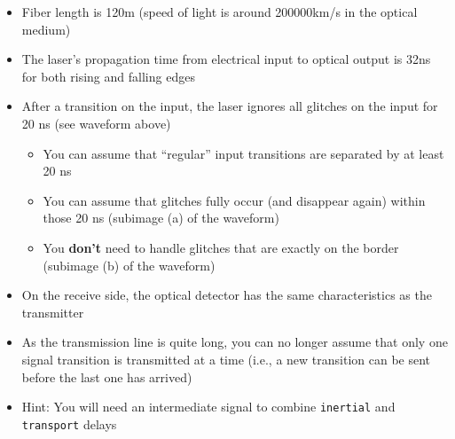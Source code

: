 \documentclass[12pt,epsf,makeidx,oneside]{book}
\begin{document}
\begin{itemize}[noitemsep]
  \item Fiber length is 120m (speed of light is around 200000km/s in the optical medium)
  \item The laser's propagation time from electrical input to optical output is 32ns for both rising and falling edges
  \item After a transition on the input, the laser ignores all glitches on the input for 20 ns (see waveform above)
  \begin{itemize}[noitemsep]
    \item You can assume that ``regular'' input transitions are separated by at least 20 ns
    \item You can assume that glitches fully occur (and disappear again) within those 20 ns (subimage (a) of the waveform)
    \item You {\bf don't} need to handle glitches that are exactly on the border (subimage (b) of the waveform)
  \end{itemize}
  \item On the receive side, the optical detector has the same characteristics as the transmitter
  \item As the transmission line is quite long, you can no longer assume that only one signal transition is transmitted at a time (i.e., a new transition can be sent before the last one has arrived)
  \item Hint: You will need an intermediate signal to combine {\tt inertial} and {\tt transport} delays
\end{itemize}
\end{document}

